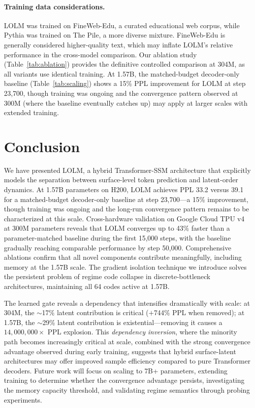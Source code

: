\documentclass{article}
\begin{document}
\paragraph{Training data considerations.}
LOLM was trained on FineWeb-Edu, a curated educational web corpus, while Pythia
was trained on The Pile, a more diverse mixture. FineWeb-Edu is generally
considered higher-quality text, which may inflate LOLM's relative performance
in the cross-model comparison. Our ablation study
(Table~\ref{tab:ablation}) provides the definitive controlled comparison at
304M, as all variants use identical training. At 1.57B, the matched-budget
decoder-only baseline (Table~\ref{tab:scaling}) shows a 15\% PPL improvement
for LOLM at step 23{,}700, though training was ongoing and the convergence
pattern observed at 300M (where the baseline eventually catches up) may
apply at larger scales with extended training.

\section{Conclusion}
\label{sec:conclusion}

We have presented LOLM, a hybrid Transformer-SSM architecture that explicitly
models the separation between surface-level token prediction and latent-order
dynamics. At 1.57B parameters on H200, LOLM achieves PPL 33.2 versus 39.1 for
a matched-budget decoder-only baseline at step 23{,}700---a 15\% improvement,
though training was ongoing and the long-run convergence pattern remains to be
characterized at this scale. Cross-hardware validation on Google Cloud TPU v4
at 300M parameters reveals that LOLM converges up to 43\% faster than a
parameter-matched baseline during the first 15{,}000 steps, with the baseline
gradually reaching comparable performance by step 50{,}000. Comprehensive
ablations confirm that all novel components contribute meaningfully, including
memory at the 1.57B scale. The gradient isolation technique we introduce
solves the persistent problem of regime code collapse in discrete-bottleneck
architectures, maintaining all 64 codes active at 1.57B.

The learned gate reveals a dependency that intensifies dramatically with scale:
at 304M, the ${\sim}$17\% latent contribution is critical ($+$744\% PPL when
removed); at 1.57B, the ${\sim}$29\% latent contribution is
existential---removing it causes a $14{,}000{,}000\times$ PPL explosion. This
\emph{dependency inversion}, where the minority path becomes increasingly
critical at scale, combined with the strong convergence advantage observed
during early training, suggests that hybrid surface-latent architectures may
offer improved sample efficiency compared to pure Transformer decoders.
Future work will focus on scaling to 7B+ parameters, extending training to
determine whether the convergence advantage persists, investigating the memory
capacity threshold, and validating regime semantics through probing experiments.
\end{document}
